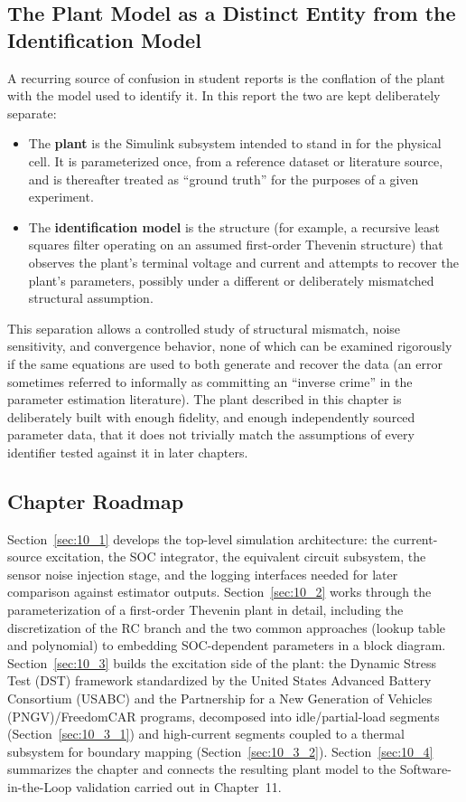 \subsection{The Plant Model as a Distinct Entity from the Identification Model}

A recurring source of confusion in student reports is the conflation
of the plant with the model used to identify it. In this report the
two are kept deliberately separate:

\begin{itemize}
    \item The \textbf{plant} is the Simulink subsystem intended to
    stand in for the physical cell. It is parameterized once, from a
    reference dataset or literature source, and is thereafter treated
    as ``ground truth'' for the purposes of a given experiment.
    \item The \textbf{identification model} is the structure (for
    example, a recursive least squares filter operating on an assumed
    first-order Thevenin structure) that observes the plant's
    terminal voltage and current and attempts to recover the plant's
    parameters, possibly under a different or deliberately mismatched
    structural assumption.
\end{itemize}

This separation allows a controlled study of structural mismatch,
noise sensitivity, and convergence behavior, none of which can be
examined rigorously if the same equations are used to both generate
and recover the data (an error sometimes referred to informally as
committing an ``inverse crime'' in the parameter estimation
literature). The plant described in this chapter is deliberately built
with enough fidelity, and enough independently sourced parameter data,
that it does not trivially match the assumptions of every identifier
tested against it in later chapters.

\subsection{Chapter Roadmap}

Section~\ref{sec:10_1} develops the top-level simulation architecture:
the current-source excitation, the SOC integrator, the equivalent
circuit subsystem, the sensor noise injection stage, and the logging
interfaces needed for later comparison against estimator outputs.
Section~\ref{sec:10_2} works through the parameterization of a
first-order Thevenin plant in detail, including the discretization of
the RC branch and the two common approaches (lookup table and
polynomial) to embedding SOC-dependent parameters in a block diagram.
Section~\ref{sec:10_3} builds the excitation side of the plant: the
Dynamic Stress Test (DST) framework standardized by the United States
Advanced Battery Consortium (USABC) and the Partnership for a New
Generation of Vehicles (PNGV)/FreedomCAR programs, decomposed into
idle/partial-load segments (Section~\ref{sec:10_3_1}) and high-current
segments coupled to a thermal subsystem for boundary mapping
(Section~\ref{sec:10_3_2}). Section~\ref{sec:10_4} summarizes the
chapter and connects the resulting plant model to the
Software-in-the-Loop validation carried out in Chapter~11.

